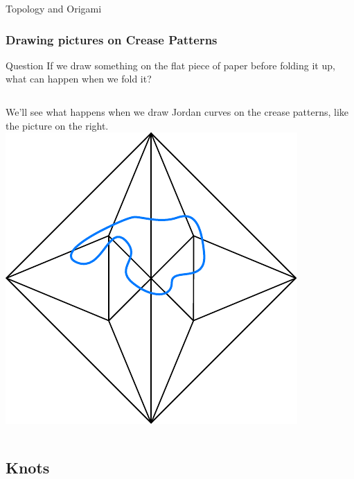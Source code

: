 \documentclass{beamer}
\begin{document}
\begin{frame}
\Huge{\centerline{Topology and Origami}}
\end{frame}

\begin{frame}
\frametitle{Drawing pictures on Crease Patterns}
\begin{block}{Question}
If we draw something on the flat piece of paper before folding it up, what can happen when we fold it? 
\end{block}
\pause
\begin{columns}[c]
We'll see what happens when we draw Jordan curves on the crease patterns, like the picture on the right. 
\includegraphics[width=\textwidth]{knot_pix/j-curve-birdbase.pdf}
\end{columns}
\end{frame}

\subsection{Knots}
\end{document}
